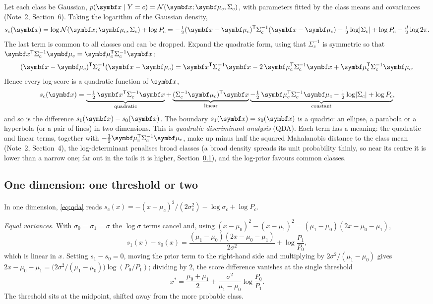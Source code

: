 \documentclass[11pt]{article}
\begin{document}
Let each class be Gaussian, $p(\x \mid Y = c) = \Normal(\x; \vmu_c, \Sigma_c)$, with parameters fitted by the class
means and covariances (Note~2, Section~6). Taking the logarithm of the Gaussian density,
\[
  s_c(\x) = \log \Normal(\x; \vmu_c, \Sigma_c) + \log P_c
  = -\tfrac12 (\x - \vmu_c)\T \Sigma_c^{-1} (\x - \vmu_c) - \tfrac12 \log\lvert\Sigma_c\rvert + \log P_c
  - \tfrac{d}{2} \log 2\pi .
\]
The last term is common to all classes and can be dropped. Expand the quadratic form, using that $\Sigma_c^{-1}$ is
symmetric so that $\x\T \Sigma_c^{-1} \vmu_c = \vmu_c\T \Sigma_c^{-1} \x$:
\[
  (\x - \vmu_c)\T \Sigma_c^{-1} (\x - \vmu_c) = \x\T \Sigma_c^{-1} \x - 2\, \vmu_c\T \Sigma_c^{-1} \x
  + \vmu_c\T \Sigma_c^{-1} \vmu_c .
\]
Hence every log-score is a quadratic function of $\x$,
\begin{equation}\label{eq:qda}
  s_c(\x) = \underbrace{-\tfrac12\, \x\T \Sigma_c^{-1} \x}_{\text{quadratic}}
  + \underbrace{(\Sigma_c^{-1} \vmu_c)\T \x}_{\text{linear}}
  \underbrace{- \tfrac12\, \vmu_c\T \Sigma_c^{-1} \vmu_c - \tfrac12 \log\lvert\Sigma_c\rvert + \log P_c}_{\text{constant}} ,
\end{equation}
and so is the difference $s_1(\x) - s_0(\x)$. The boundary $s_1(\x) = s_0(\x)$ is a quadric: an ellipse, a parabola or a
hyperbola (or a pair of lines) in two dimensions. This is \emph{quadratic discriminant analysis} (QDA). Each term has a
meaning: the quadratic and linear terms, together with $-\tfrac12 \vmu_c\T \Sigma_c^{-1} \vmu_c$, make up minus half the
squared Mahalanobis distance to the class mean (Note~2, Section~4), the log-determinant
penalises broad classes (a broad density spreads its unit probability thinly, so near its centre it is lower than a
narrow one; far out in the tails it is higher, Section~\ref{sec:onedim}), and the log-prior favours common classes.

\subsection{One dimension: one threshold or two}\label{sec:onedim}

In one dimension, \eqref{eq:qda} reads $s_c(x) = -(x - \mu_c)^2 / (2\sigma_c^2) - \log \sigma_c + \log P_c$.

\emph{Equal variances.} With $\sigma_0 = \sigma_1 = \sigma$ the $\log\sigma$ terms cancel and, using
$(x - \mu_0)^2 - (x - \mu_1)^2 = (\mu_1 - \mu_0)(2x - \mu_0 - \mu_1)$,
\[
  s_1(x) - s_0(x) = \frac{(\mu_1 - \mu_0)(2x - \mu_0 - \mu_1)}{2\sigma^2} + \log\frac{P_1}{P_0} ,
\]
which is linear in $x$. Setting $s_1 - s_0 = 0$, moving the prior term to the right-hand side and multiplying by $2\sigma^2/(\mu_1 - \mu_0)$ gives
$2x - \mu_0 - \mu_1 = \big(2\sigma^2/(\mu_1 - \mu_0)\big) \log(P_0/P_1)$; dividing by $2$, the score difference
vanishes at the single threshold
\begin{equation}\label{eq:thr1d}
  x^* = \frac{\mu_0 + \mu_1}{2} + \frac{\sigma^2}{\mu_1 - \mu_0} \log\frac{P_0}{P_1} .
\end{equation}
The threshold sits at the midpoint, shifted away from the more probable class.
\end{document}
